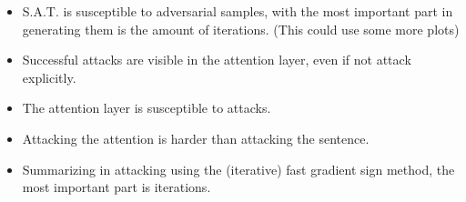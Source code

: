 \begin{itemize}
    \item S.A.T. is susceptible to adversarial samples, with the most important part in generating them is the amount of iterations. (This could use some more plots)
    \item Successful attacks are visible in the attention layer, even if not attack explicitly.
    \item The attention layer is susceptible to attacks.
    \item Attacking the attention is harder than attacking the sentence.
    \item Summarizing in attacking using the (iterative) fast gradient sign method, the most important part is iterations.
\end{itemize}
